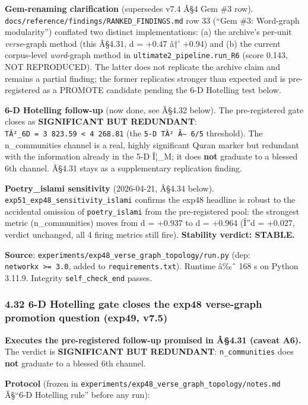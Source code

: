 \documentclass[
]{article}
\begin{document}
\textbf{Gem-renaming clarification} (supersedes v7.4 Â§4 Gem \#3 row).
\texttt{docs/reference/findings/RANKED\_FINDINGS.md} row 33 (``Gem \#3:
Word-graph modularity'') conflated two distinct implementations: (a) the
archive's per-unit \emph{verse}-graph method (this Â§4.31, d = +0.47 â†'
+0.94) and (b) the current corpus-level \emph{word}-graph method in
\texttt{ultimate2\_pipeline.run\_R6} (score 0.143, NOT REPRODUCED). The
latter does not replicate the archive claim and remains a partial
finding; the former replicates stronger than expected and is
pre-registered as a PROMOTE candidate pending the 6-D Hotelling test
below.

\textbf{6-D Hotelling follow-up} (now done, see Â§4.32 below). The
pre-registered gate closes as \textbf{SIGNIFICANT BUT REDUNDANT}:
\texttt{TÂ²\_6D\ =\ 3\ 823.59\ \textless{}\ 4\ 268.81} (the
\texttt{5-D\ TÂ²\ Ã—\ 6/5} threshold). The n\_communities channel is a
real, highly significant Quran marker but redundant with the information
already in the 5-D Î¦\_M; it does \textbf{not} graduate to a blessed 6th
channel. Â§4.31 stays as a supplementary replication finding.

\textbf{Poetry\_islami sensitivity} (2026-04-21, Â§4.34 below).
\texttt{exp51\_exp48\_sensitivity\_islami} confirms the exp48 headline
is robust to the accidental omission of \texttt{poetry\_islami} from the
pre-registered pool: the strongest metric (n\_communities) moves from d
= +0.937 to d = +0.964 (Î''d = +0.027, verdict unchanged, all 4 firing
metrics still fire). \textbf{Stability verdict: STABLE.}

\textbf{Source}:
\texttt{experiments/exp48\_verse\_graph\_topology/run.py} (dep:
\texttt{networkx\ \textgreater{}=\ 3.0}, added to
\texttt{requirements.txt}). Runtime â‰ˆ 168 s on Python 3.11.9.
Integrity \texttt{self\_check\_end} passes.

\subsubsection{4.32 6-D Hotelling gate closes the exp48 verse-graph
promotion question (exp49,
v7.5)}\label{d-hotelling-gate-closes-the-exp48-verse-graph-promotion-question-exp49-v7.5}

\textbf{Executes the pre-registered follow-up promised in Â§4.31 (caveat
A6).} The verdict is \textbf{SIGNIFICANT BUT REDUNDANT}:
\texttt{n\_communities} does \textbf{not} graduate to a blessed 6th
channel.

\textbf{Protocol} (frozen in
\texttt{experiments/exp48\_verse\_graph\_topology/notes.md} Â§``6-D
Hotelling rule'' before any run):
\end{document}
